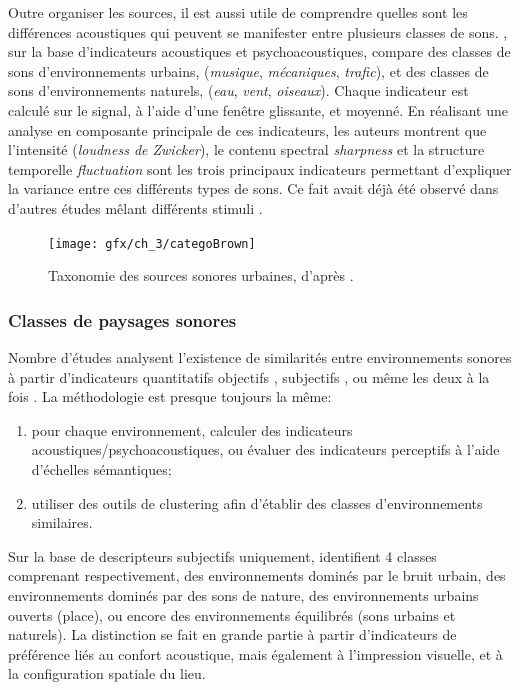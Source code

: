 Outre organiser les sources, il est aussi utile de comprendre quelles sont les différences acoustiques qui peuvent se manifester entre plusieurs classes de sons. \citep{yang2013psychoacoustical}, sur la base d'indicateurs acoustiques et psychoacoustiques, compare des classes de sons d'environnements urbains, (\emph{musique}, \emph{mécaniques}, \emph{trafic}), et des classes de sons d'environnements naturels, (\emph{eau}, \emph{vent}, \emph{oiseaux}). Chaque indicateur est calculé sur le signal, à l'aide d'une fenêtre glissante, et moyenné. En réalisant une analyse en composante principale de ces indicateurs, les auteurs montrent que l'intensité (\emph{loudness  de Zwicker}), le contenu spectral \emph{sharpness} et la structure temporelle \emph{fluctuation} sont les trois principaux indicateurs permettant d'expliquer la variance entre ces différents types de sons. Ce fait avait déjà été observé dans d'autres études mêlant différents stimuli \citep{de2006quiet,botteldooren2006temporal}.


\begin{figure}[t]
        \myfloatalign
        \texttt{[image: gfx/ch\_3/categoBrown]}
        \caption[Taxonomie des sources sonores urbaines.]{Taxonomie des sources sonores urbaines, d'après \citep{brown2011towards}.}\label{fig:catSoundscapeBrown}
\end{figure}

\subsubsection{Classes de paysages sonores}
\label{sec:ch3_classePaysage}

Nombre d'études analysent l'existence de similarités entre environnements sonores à partir d'indicateurs quantitatifs objectifs \citep{rychtarikova2013soundscape}, subjectifs \citep{jeon2013soundwalk}, ou même les deux à la fois \citep{torija2013application,ricciardi2015sound}. La méthodologie est presque toujours la même:

\begin{enumerate}
\item pour chaque environnement, calculer des indicateurs acoustiques/psychoacoustiques, ou évaluer des indicateurs perceptifs à l'aide d'échelles sémantiques;
\item utiliser des outils de clustering afin d'établir des classes d'environnements similaires.
\end{enumerate}

Sur la base de descripteurs subjectifs uniquement, \citep{jeon2013soundwalk} identifient 4 classes comprenant respectivement, des environnements dominés par le bruit urbain, des environnements dominés par des sons de nature, des environnements urbains ouverts (place), ou encore des environnements équilibrés (sons urbains et naturels). La distinction se fait en grande partie à partir d'indicateurs de préférence liés au confort acoustique, mais également à l'impression visuelle, et à la configuration spatiale du lieu.  

